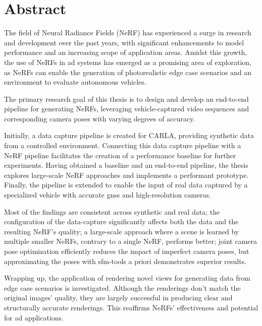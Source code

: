 \chapter*{Abstract}

The field of Neural Radiance Fields (NeRF) has experienced a surge in research and development over the past years, with significant enhancements to model performance and an increasing scope of application areas. Amidst this growth, the use of NeRFs in \acrfull{ad} systems has emerged as a promising area of exploration, as NeRFs can enable the generation of photorealistic edge case scenarios and an environment to evaluate autonomous vehicles.

The primary research goal of this thesis is to design and develop an end-to-end pipeline for generating NeRFs, leveraging vehicle-captured video sequences and corresponding camera poses with varying degrees of accuracy.

Initially, a data capture pipeline is created for CARLA, providing synthetic data from a controlled environment. Connecting this data capture pipeline with a NeRF pipeline facilitates the creation of a performance baseline for further experiments. Having obtained a baseline and an end-to-end pipeline, the thesis explores large-scale NeRF approaches and implements a performant prototype. Finally, the pipeline is extended to enable the input of real data captured by a specialized vehicle with accurate \acrfull{gnss} and high-resolution cameras.

Most of the findings are consistent across synthetic and real data; the configuration of the data-capture significantly affects both the data and the resulting NeRF's quality; a large-scale approach where a scene is learned by multiple smaller NeRFs, contrary to a single NeRF, performs better; joint camera pose optimization efficiently reduces the impact of imperfect camera poses, but approximating the poses with \acrfull{sfm}-tools a priori demonstrates superior results.



Wrapping up, the application of rendering novel views for generating data from edge case scenarios is investigated. Although the renderings don't match the original images' quality, they are largely successful in producing clear and structurally accurate renderings. This reaffirms NeRFs' effectiveness and potential for \acrshort{ad} applications.